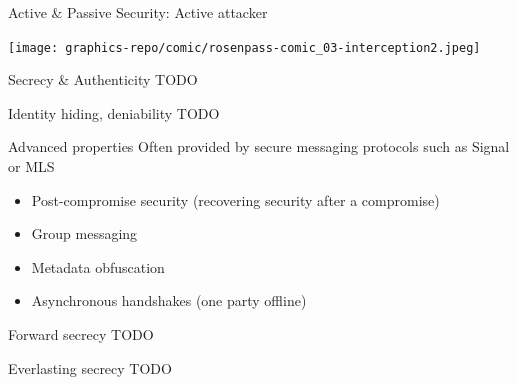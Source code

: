 \begin{frame}{Active \& Passive Security: Active attacker}
  \raggedright
  \texttt{[image: graphics-repo/comic/rosenpass-comic\_03-interception2.jpeg]}
\end{frame}

\begin{frame}{Secrecy \& Authenticity}
  TODO
\end{frame}

\begin{frame}{Identity hiding, deniability}
  TODO
\end{frame}

\begin{frame}{Advanced properties}
  Often provided by secure messaging protocols such as Signal or MLS

  \begin{itemize}
    \item Post-compromise security (recovering security after a compromise)
    \item Group messaging
    \item Metadata obfuscation
    \item Asynchronous handshakes (one party offline)
  \end{itemize}
\end{frame}

\begin{frame}{Forward secrecy}
  TODO
\end{frame}

\begin{frame}{Everlasting secrecy}
  TODO
\end{frame}

